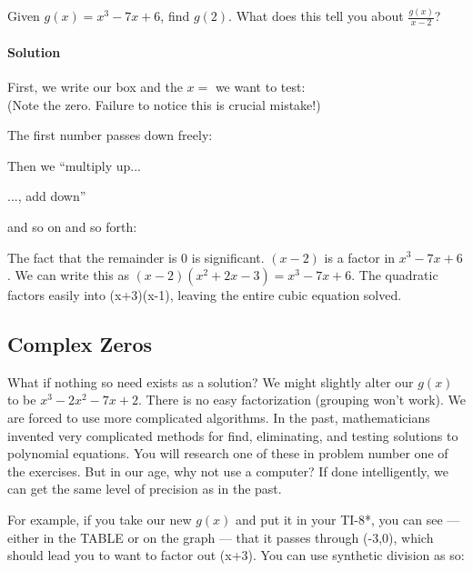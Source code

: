 \begin{example}
Given $g(x) = x^3-7x+6$, find $g(2)$.  What does this tell you about $\frac{g(x)}{x-2}$?

\paragraph{Solution}
First, we write our box and the $x=$ we want to test:\\


(Note the zero.  Failure to notice this is crucial mistake!)


The first number passes down freely:


Then we ``multiply up...


..., add down''


and so on and so forth:

The fact that the remainder is 0 is significant.  $(x-2)$ is a factor in $x^3-7x+6$.  We can write
this as $(x-2)(x^2+2x-3)=x^3-7x+6$.  The quadratic factors easily into (x+3)(x-1), leaving the
entire cubic equation solved.
\end{example}

\subsection{Complex Zeros}
What if nothing so need exists as a solution?  We might slightly alter our $g(x)$ to be
$x^3-2x^2-7x+2$.  There is no easy factorization (grouping won't work).  We are forced
to use more complicated algorithms.  In the past, mathematicians invented very complicated
methods for find, eliminating, and testing solutions to polynomial equations.  You will research
one of these in problem number one of the exercises.  But in our age, why not use a computer?
If done intelligently, we can get the same level of precision as in the past.

For example, if you take our new $g(x)$ and put it in your TI-8*, you can see --- either in the
TABLE or on the graph --- that it passes through (-3,0), which should lead you to want to
factor out (x+3).  You can use synthetic division as so:


